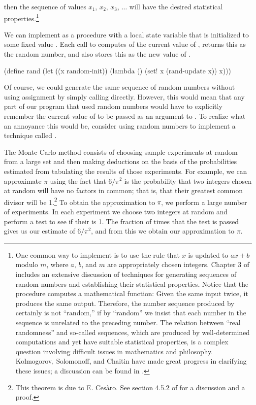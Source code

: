 \noindent
then the sequence of values \( x_1 \), \( x_2 \), \( x_3 \), \( \dots \) will have the
desired statistical properties.\footnote{One common way to implement
 is to use the rule that \( x \) is updated to \( ax + b \)
modulo \( m \), where \( a \), \( b \), and \( m \) are appropriately chosen
integers.  Chapter 3 of  includes an extensive discussion of
techniques for generating sequences of random numbers and establishing their
statistical properties.  Notice that the  procedure computes
a mathematical function: Given the same input twice, it produces the same
output.  Therefore, the number sequence produced by 
certainly is not ``random,'' if by ``random'' we insist that each number in the
sequence is unrelated to the preceding number.  The relation between ``real
randomness'' and so-called  sequences, which are
produced by well-determined computations and yet have suitable statistical
properties, is a complex question involving difficult issues in mathematics and
philosophy.  Kolmogorov, Solomonoff, and Chaitin have made great progress in
clarifying these issues; a discussion can be found in .}

We can implement  as a procedure with a local state variable
 that is initialized to some fixed value .  Each call
to  computes  of the current value of ,
returns this as the random number, and also stores this as the new value of
.

\begin{codeBlock}
(define rand (let ((x random-init))
               (lambda ()
                 (set! x (rand-update x))
                 x)))
\end{codeBlock}

\noindent
Of course, we could generate the same sequence of random numbers without using
assignment by simply calling  directly.  However, this would
mean that any part of our program that used random numbers would have to
explicitly remember the current value of  to be passed as an argument
to .  To realize what an annoyance this would be, consider
using random numbers to implement a technique called .

The Monte Carlo method consists of choosing sample experiments at random from a
large set and then making deductions on the basis of the probabilities
estimated from tabulating the results of those experiments.  For example, we
can approximate \( \pi \) using the fact that \( 6/\pi^2 \) is the probability
that two integers chosen at random will have no factors in common; that is,
that their greatest common divisor will be 1.\footnote{This theorem is due to
E. Ces\`aro.  See section 4.5.2 of  for a discussion and a proof.} To
obtain the approximation to \( \pi \), we perform a large number of experiments.
In each experiment we choose two integers at random and perform a test to see
if their  is 1.  The fraction of times that the test is passed
gives us our estimate of \( 6/\pi^2 \), and from this we obtain our
approximation to \( \pi \).


